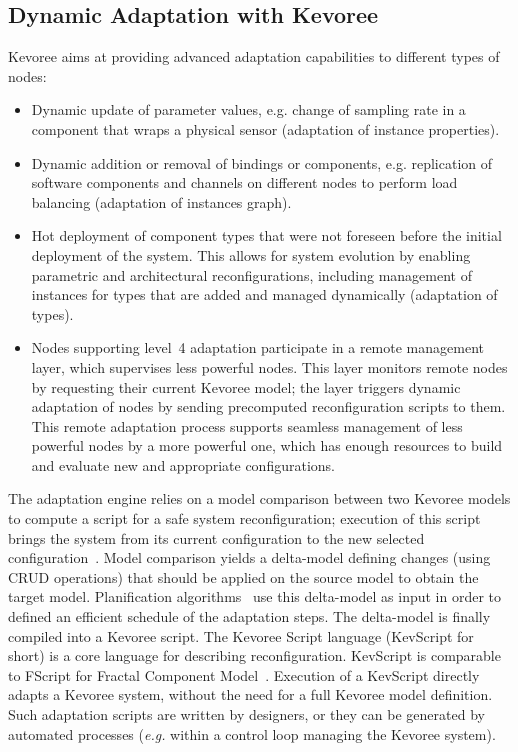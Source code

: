 \subsection{Dynamic Adaptation with Kevoree}
Kevoree aims at providing advanced adaptation capabilities to different types of nodes:
\begin{itemize}
\setlength{\itemsep}{0pt}
\setlength{\parskip}{0pt}
\setlength{\parsep}{0pt}
\item 
{} Dynamic update of parameter values, e.g. change of sampling rate in a component that wraps a physical sensor (adaptation of instance properties).

\item 
{} Dynamic addition or removal of bindings or components, e.g. replication of software components and channels on different nodes to perform load balancing (adaptation of instances graph).

\item 
{} Hot deployment of component types that were not foreseen before the initial deployment of the system. 
This allows for system evolution by enabling parametric and architectural reconfigurations, including management of instances for types that are added and managed dynamically (adaptation of types).

\item 
{} Nodes supporting level~4 adaptation participate in a remote management layer, which supervises less powerful nodes. 
This layer monitors remote nodes by requesting their current Kevoree model;
the layer triggers dynamic adaptation of nodes by sending precomputed reconfiguration scripts to them. 
This remote adaptation process supports seamless management of less powerful nodes by a more powerful one, which has enough resources to build and evaluate new and appropriate  configurations.
\end{itemize}

The adaptation engine relies on a model comparison between two Kevoree models to compute a  script for a safe system reconfiguration;
execution of this script brings the system from its current configuration to the new selected configuration~\cite{morin09a}. 
Model comparison yields  a delta-model defining changes (using CRUD operations) that should be applied on the source model to obtain the target model. 
Planification algorithms~\cite{daubert} use this delta-model as input in order to defined an efficient schedule of the adaptation steps. 
The delta-model is finally compiled into a Kevoree script. 
The Kevoree Script language (KevScript for short) is a core language for describing reconfiguration.
KevScript  is comparable to FScript for Fractal Component Model~\cite{DBLP:journals/adt/DavidLLC09}. 
Execution of a KevScript directly adapts a Kevoree system, without the need for  a full Kevoree model definition. 
Such adaptation scripts are written by designers, or they can be generated  by automated processes ({\em e.g.} within a  control loop managing the Kevoree system).
